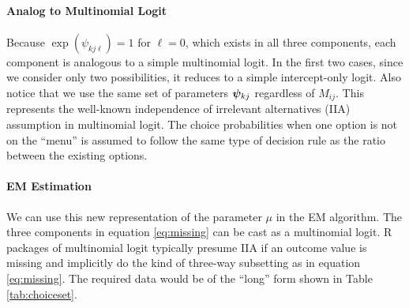 \documentclass[11pt]{article}
\begin{document}
\paragraph{Analog to Multinomial Logit} Because \(\exp(\psi_{kj\ell}) = 1\) for \(\ell = 0\), which exists in all three components, each component is analogous to a simple multinomial logit. In the first two cases, since we consider only two possibilities, it reduces to a simple intercept-only logit. Also notice that we use the same set of parameters \(\bm{\psi}_{kj}\) regardless of \(M_{ij}\). This represents the well-known independence of irrelevant alternatives (IIA) assumption in multinomial logit. The choice probabilities when one option is not on the ``menu'' is assumed to follow the same type of decision rule as the ratio between the existing options.  

\paragraph{EM Estimation} We can use this new representation of the parameter \(\mu\) in the EM algorithm. The three components in equation \ref{eq:missing} can be cast as a multinomial logit. R packages of multinomial logit typically presume IIA if an outcome value is missing and implicitly do the kind of three-way subsetting as in equation \ref{eq:missing}. The required data would be of the ``long'' form shown in Table \ref{tab:choiceset}.
\end{document}
